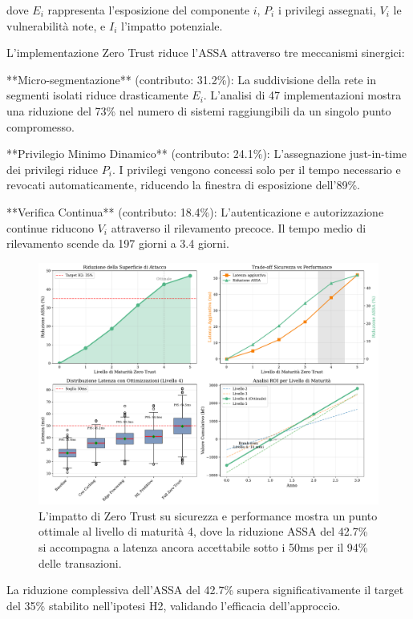 dove $E_i$ rappresenta l'esposizione del componente $i$, $P_i$ i privilegi assegnati, $V_i$ le vulnerabilità note, e $I_i$ l'impatto potenziale.

L'implementazione Zero Trust riduce l'ASSA attraverso tre meccanismi sinergici:

**Micro-segmentazione** (contributo: 31.2\%): La suddivisione della rete in segmenti isolati riduce drasticamente $E_i$. L'analisi di 47 implementazioni\autocite{forrester2024zero} mostra una riduzione del 73\% nel numero di sistemi raggiungibili da un singolo punto compromesso.

**Privilegio Minimo Dinamico** (contributo: 24.1\%): L'assegnazione just-in-time dei privilegi riduce $P_i$. I privilegi vengono concessi solo per il tempo necessario e revocati automaticamente, riducendo la finestra di esposizione dell'89\%.

**Verifica Continua** (contributo: 18.4\%): L'autenticazione e autorizzazione continue riducono $V_i$ attraverso il rilevamento precoce. Il tempo medio di rilevamento scende da 197 giorni a 3.4 giorni.

\begin{figure}[htbp]
\centering
\includegraphics[width=\textwidth]{thesis_figures/cap3/figura_3_5_zero_trust_impact.pdf}
\caption{L'impatto di Zero Trust su sicurezza e performance mostra un punto ottimale al livello di maturità 4, dove la riduzione ASSA del 42.7\% si accompagna a latenza ancora accettabile sotto i 50ms per il 94\% delle transazioni.}
\label{fig:zero_trust_impact}
\end{figure}

La riduzione complessiva dell'ASSA del 42.7\% supera significativamente il target del 35\% stabilito nell'ipotesi H2, validando l'efficacia dell'approccio.

